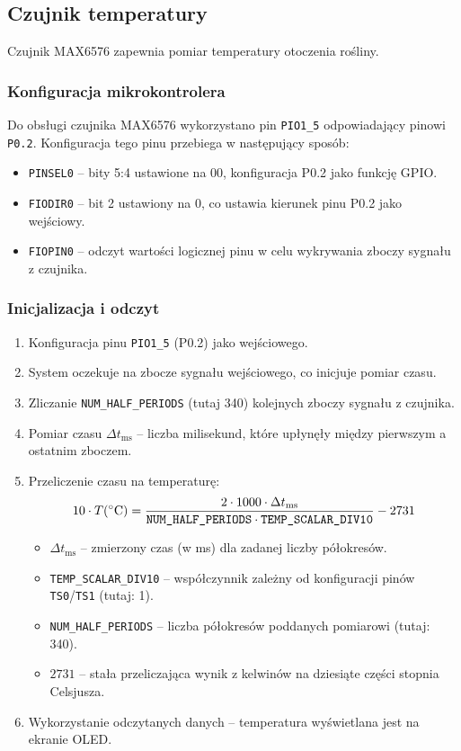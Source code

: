 \subsection{Czujnik temperatury}
Czujnik MAX6576 zapewnia pomiar temperatury otoczenia rośliny.

\subsubsection{Konfiguracja mikrokontrolera}

Do obsługi czujnika MAX6576 wykorzystano pin \texttt{PIO1\_5} odpowiadający pinowi \texttt{P0.2}. Konfiguracja tego pinu przebiega w następujący sposób:

\begin{itemize}
    \item \texttt{PINSEL0} – bity 5:4 ustawione na 00, konfiguracja P0.2 jako funkcję GPIO.
    \item \texttt{FIODIR0} – bit 2 ustawiony na 0, co ustawia kierunek pinu P0.2 jako wejściowy.
    \item \texttt{FIOPIN0} – odczyt wartości logicznej pinu w celu wykrywania zboczy sygnału z czujnika.
\end{itemize}

\subsubsection{Inicjalizacja i odczyt}
\begin{enumerate}
    \item Konfiguracja pinu \texttt{PIO1\_5} (P0.2) jako wejściowego.
    \item System oczekuje na zbocze sygnału wejściowego, co inicjuje pomiar czasu.
    \item Zliczanie \texttt{NUM\_HALF\_PERIODS} (tutaj 340) kolejnych zboczy sygnału z czujnika.\\
    \item Pomiar czasu \(\Delta t_{\text{ms}}\) – liczba milisekund, które upłynęły między pierwszym a ostatnim zboczem.
    \item Przeliczenie czasu na temperaturę:
    \[
    10 \cdot T(\degree \mathrm{C}) = \frac{2 \cdot 1000 \cdot \Delta t_{\text{ms}}}{\texttt{NUM\_HALF\_PERIODS} \cdot \texttt{TEMP\_SCALAR\_DIV10}} - 2731
    \]
    \begin{itemize}
        \item \(\Delta t_{\text{ms}}\) – zmierzony czas (w ms) dla zadanej liczby półokresów.
        \item \texttt{TEMP\_SCALAR\_DIV10} – współczynnik zależny od konfiguracji pinów \texttt{TS0}/\texttt{TS1} (tutaj: 1).
        \item \texttt{NUM\_HALF\_PERIODS} – liczba półokresów poddanych pomiarowi (tutaj: 340).
        \item \(2731\) – stała przeliczająca wynik z kelwinów na dziesiąte części stopnia Celsjusza.
    \end{itemize}
    \item Wykorzystanie odczytanych danych – temperatura wyświetlana jest na ekranie OLED.
\end{enumerate}

